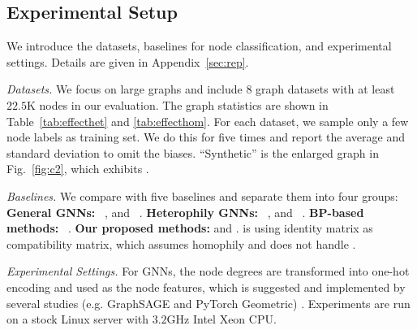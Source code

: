 
\subsection*{Experimental Setup}
We introduce the datasets, baselines for node classification, and experimental settings.
Details are given in Appendix~\ref{sec:rep}.

\textit{Datasets.}
We focus on large graphs and include $8$ graph datasets with at least $22.5$K nodes in our evaluation.
The graph statistics are shown in Table~\ref{tab:effecthet} and \ref{tab:effecthom}. 
For each dataset, we sample only a few node labels as training set.
We do this for five times and report the average and standard deviation to omit the biases.
``Synthetic'' is the enlarged graph in Fig.~\ref{fig:c2}, which exhibits \xophily \nef.

\textit{Baselines.}
We compare \method with five baselines and separate them into four groups: {\bf General GNNs:} \gcn~\cite{kipf2016semi}, and \appnp~\cite{klicpera2018predict}. {\bf Heterophily GNNs:} \mixhop~\cite{abu2019mixhop}, and \gprgnn~\cite{chien2021adaptive}. {\bf BP-based methods:} \hols~\cite{eswaran2020higher}. {\bf Our proposed methods:} \methodhom and \method.
\methodhom is \method using identity matrix as compatibility matrix, which assumes homophily and does not handle \nef.

\textit{Experimental Settings.}
For GNNs, the node degrees are transformed into one-hot encoding and used as the node features, which is suggested and implemented by several studies (e.g. GraphSAGE and PyTorch Geometric) \cite{Fey/Lenssen/2019, hamilton2017inductive, hamilton2017representation}.
Experiments are run on a stock Linux server with $3.2$GHz Intel Xeon CPU.

